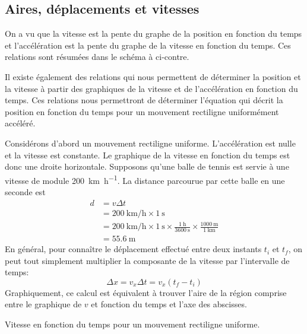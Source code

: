 \subsection{Aires, déplacements et vitesses}

On a vu que la vitesse est la pente du graphe de la position en fonction du
temps et l'accélération est la pente du graphe de la vitesse en fonction du
temps.  Ces relations sont résumées dans le schéma à ci-contre.

Il existe également des relations qui nous permettent de déterminer la position
et la vitesse à partir des graphiques de la vitesse et de l'accélération en
fonction du temps.  Ces relations nous permettront de déterminer l'équation qui
décrit la position en fonction du temps pour un mouvement rectiligne
uniformément accéléré.

Considérons d'abord un mouvement rectiligne uniforme.  L'accélération est nulle
et la vitesse est constante.  Le graphique de la vitesse en fonction du temps
est donc une droite horizontale.  Supposons qu'une balle de tennis est servie à
une vitesse de module \SI{200}{\kilo\meter\per\hour}.  
La distance parcourue par cette balle en une seconde est
\begin{align*}
  d &= v \Delta t \\
    &= \SI{200}{\kilo\meter\per\hour} \times \SI{1}{\second} \\
    &= \SI{200}{\kilo\meter\per\hour} \times \SI{1}{\second}
       \times \frac{\SI{1}{\hour}}{\SI{3600}{\second}}
       \times \frac{\SI{1000}{\meter}}{\SI{1}{\kilo\meter}} \\
    &= \SI{55.6}{\meter}
\end{align*}
En général, pour connaître le déplacement effectué
entre deux instants $t_i$ et $t_f$, on peut tout simplement multiplier la
composante de la vitesse par l'intervalle de temps:
\[
  \Delta x = v_x \Delta t = v_x (t_f - t_i)
\]
Graphiquement, ce calcul est équivalent à trouver l'aire de la région comprise
entre le graphique de $v$ et fonction du temps et l'axe des abscisses.

\begin{marginfigure}
  \label{fig:mru_vx}
  \caption{Vitesse en fonction du temps pour
    un mouvement rectiligne uniforme.}
\end{marginfigure}

